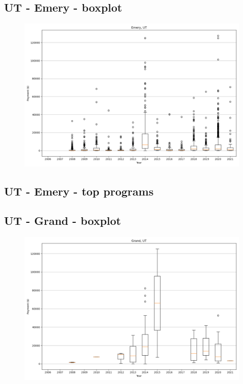 \subsection*{UT - Emery - boxplot}
\begin{figure}[h]
\centering
\includegraphics[width=7in]{../output/boxplots/counties/Emery-UT_boxplot.png}
\end{figure}


\subsection*{UT - Emery - top programs}

\newpage
\subsection*{UT - Grand - boxplot}
\begin{figure}[h]
\centering
\includegraphics[width=7in]{../output/boxplots/counties/Grand-UT_boxplot.png}
\end{figure}


